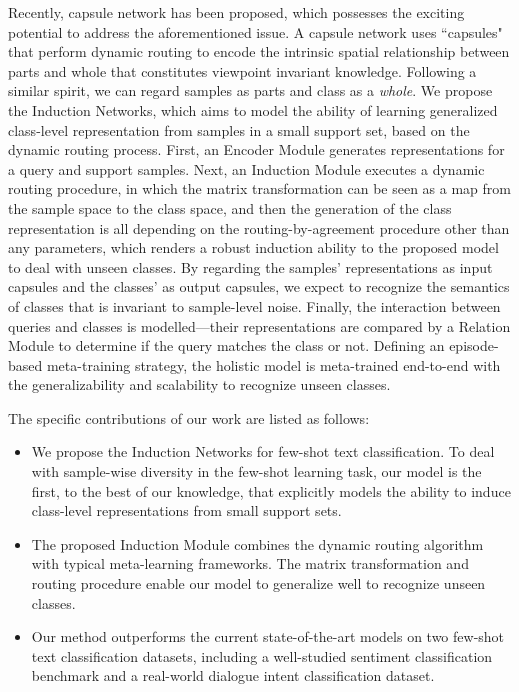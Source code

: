 \documentclass[11pt,a4paper]{article}
\begin{document}
Recently, capsule network \citep{sabour2017dynamic} has been proposed, which possesses the exciting potential to address the aforementioned issue. A capsule network uses ``capsules" that perform dynamic routing to encode the intrinsic spatial relationship between parts and whole that constitutes viewpoint invariant knowledge.
Following a similar spirit, we can regard samples as parts and class as a \textit{whole}.
We propose the Induction Networks, which aims to model the ability of learning generalized class-level representation from samples in a small support set, based on the dynamic routing process.
First, an Encoder Module generates representations for a query and support samples. 
Next, an Induction Module executes a dynamic routing procedure, in which the matrix transformation can be seen as a map from the sample space to the class space, and then the generation of the class representation is all depending on the routing-by-agreement procedure other than any parameters, which renders a robust induction ability to the proposed model to deal with unseen classes. 
By regarding the samples' representations as input capsules and the classes' as output capsules, we expect to recognize the semantics of classes that is invariant to sample-level noise. 
Finally, the interaction between queries and classes is modelled---their representations are compared by a Relation Module to determine if the query matches the class or not. Defining an episode-based meta-training strategy, the holistic model is meta-trained end-to-end with the generalizability and scalability to recognize unseen classes.

The specific contributions of our work are listed as follows:
\begin{itemize}
\item We propose the Induction Networks for few-shot text classification. To deal with sample-wise diversity in the few-shot learning task, our model is the first, to the best of our knowledge, that explicitly models the ability to induce class-level representations from small support sets.
\item The proposed Induction Module combines the dynamic routing algorithm with typical meta-learning frameworks. The matrix transformation and routing procedure enable our model to generalize well to recognize unseen classes. 
\item Our method outperforms the current state-of-the-art models on two few-shot text classification datasets, including a well-studied sentiment classification benchmark and a real-world dialogue intent classification dataset. 
\end{itemize}
\end{document}
